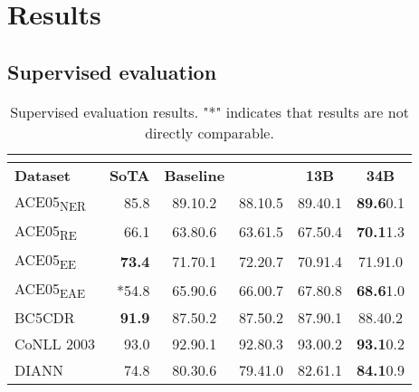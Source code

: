 \documentclass{article} \usepackage{iclr2024_conference,times}
\newcommand{\GoLLIE}{\scalerel*{\texttt{[image: logo/GoLLIE.pdf]}}{\textrm{\textbigcircle}} }
\begin{document}
\section{Results}

\subsection{Supervised evaluation}

\begin{table}
    \centering
    \caption{Supervised evaluation results. "*" indicates that results are not directly comparable.}
\begin{tabular}{l|r|cc|cc}
            \multicolumn{6}{c}{} \\
            \toprule
            \textbf{Dataset} & \textbf{SoTA} & \textbf{Baseline} & \textbf{\GoLLIE} & \textbf{\GoLLIE 13B} & \textbf{\GoLLIE 34B} \\
            \midrule
            ACE05\textsubscript{NER} & \citep{lu-etal-2022-unified} 85.8 & 89.1\tiny{0.2} & 88.1\tiny{0.5} & 89.4\tiny{0.1} & \textbf{89.6}\tiny{0.1}\\
            
            ACE05\textsubscript{RE} & \citep{lu-etal-2022-unified} 66.1 & 63.8\tiny{0.6} & 63.6\tiny{1.5} & 67.5\tiny{0.4} & \textbf{70.1}\tiny{1.3} \\
            
            ACE05\textsubscript{EE} & \citep{lu-etal-2022-unified} \textbf{73.4} & 71.7\tiny{0.1} & 72.2\tiny{0.7} & 70.9\tiny{1.4} & 71.9\tiny{1.0} \\
            
            ACE05\textsubscript{EAE} & \citep{lu-etal-2022-unified} *54.8 & 65.9\tiny{0.6} & 66.0\tiny{0.7} & 67.8\tiny{0.8} & \textbf{68.6}\tiny{1.0} \\
            
            BC5CDR & \citep{zhang2023optimizing} \textbf{91.9} & 87.5\tiny{0.2} & 87.5\tiny{0.2} & 87.9\tiny{0.1} & 88.4\tiny{0.2} \\
            
            CoNLL 2003 & \citep{lu-etal-2022-unified} 93.0 & 92.9\tiny{0.1} & 92.8\tiny{0.3} & 93.0\tiny{0.2} & \textbf{93.1}\tiny{0.2} \\
            
            DIANN & \citep{zabala2018hybrid} 74.8 & 80.3\tiny{0.6} & 79.4\tiny{1.0} & 82.6\tiny{1.1} & \textbf{84.1}\tiny{0.9} \\
            

\end{tabular}
\end{table}
\end{document}
